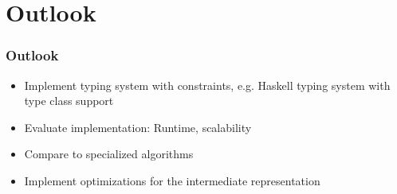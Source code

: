 \section{Outlook}

\begin{frame}
	\frametitle{Outlook}
	\begin{itemize}
		\item Implement typing system with constraints, e.g. Haskell typing system with type class support
		\item Evaluate implementation: Runtime, scalability
		\item Compare to specialized algorithms
		\item Implement optimizations for the intermediate representation
	\end{itemize}
\end{frame}